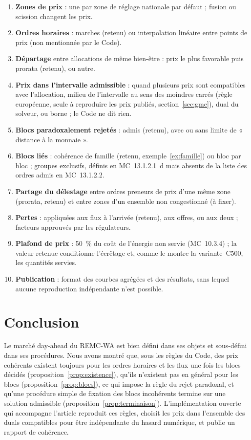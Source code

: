 \documentclass[a4paper,12pt]{article}
\theoremstyle{definition}
\newcommand{\MC}[1]{MC~#1}
\begin{document}
\begin{enumerate}
\item \textbf{Zones de prix} : une par zone de réglage nationale par défaut ; fusion ou scission changent les prix.
\item \textbf{Ordres horaires} : marches (retenu) ou interpolation linéaire entre points de prix (non mentionnée par le Code).
\item \textbf{Départage} entre allocations de même bien-être : prix le plus favorable puis prorata (retenu), ou autre.
\item \textbf{Prix dans l'intervalle admissible} : quand plusieurs prix sont compatibles avec l'allocation, milieu de l'intervalle au sens des moindres carrés (règle européenne, seule à reproduire les prix publiés, section~\ref{sec:gme}), dual du solveur, ou borne ; le Code ne dit rien.
\item \textbf{Blocs paradoxalement rejetés} : admis (retenu), avec ou sans limite de « distance à la monnaie ».
\item \textbf{Blocs liés} : cohérence de famille (retenu, exemple~\ref{ex:famille}) ou bloc par bloc ; groupes exclusifs, définis en \MC{13.1.2.1}~d mais absents de la liste des ordres admis en \MC{13.1.2.2}.
\item \textbf{Partage du délestage} entre ordres preneurs de prix d'une même zone (prorata, retenu) et entre zones d'un ensemble non congestionné (à fixer).
\item \textbf{Pertes} : appliquées aux flux à l'arrivée (retenu), aux offres, ou aux deux ; facteurs approuvés par les régulateurs.
\item \textbf{Plafond de prix} : 50~\% du coût de l'énergie non servie (\MC{10.3.4}) ; la valeur retenue conditionne l'écrêtage et, comme le montre la variante~C500, les quantités servies.
\item \textbf{Publication} : format des courbes agrégées et des résultats, sans lequel aucune reproduction indépendante n'est possible.
\end{enumerate}

\section{Conclusion}\label{sec:conclusion}

Le marché day-ahead du REMC-WA est bien défini dans ses objets et sous-défini dans ses procédures. Nous avons montré que, sous les règles du Code, des prix cohérents existent toujours pour les ordres horaires et les flux une fois les blocs décidés (proposition~\ref{prop:existence}), qu'ils n'existent pas en général pour les blocs (proposition~\ref{prop:blocs}), ce qui impose la règle du rejet paradoxal, et qu'une procédure simple de fixation des blocs incohérents termine sur une solution admissible (proposition~\ref{prop:terminaison}). L'implémentation ouverte qui accompagne l'article reproduit ces règles, choisit les prix dans l'ensemble des duals compatibles pour être indépendante du hasard numérique, et publie un rapport de cohérence.
\end{document}
